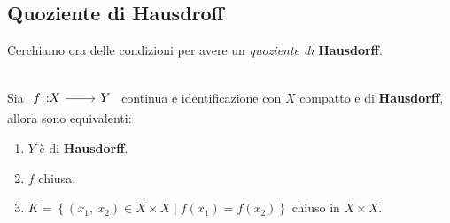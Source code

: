 \subsection{Quoziente di Hausdroff}
Cerchiamo ora delle condizioni per avere un \textit{quoziente di} \textbf{Hausdorff}.
\begin{theorema}~{}\\ \label{quozientehausdorff}
	Sia $\funz f X Y$ continua e identificazione con $X$ compatto e di \textbf{Hausdorff}, allora sono equivalenti:
		\begin{enumerate}
			\item $Y$ è di \textbf{Hausdorff}.
			\item $f$ chiusa.
			\item $K=\left\{ (x_1,\ x_2)\in X\times X \mid f(x_1)=f(x_2) \right\}$ chiuso in $X\times X$.
		\end{enumerate}
	\vspace{-3mm}
\end{theorema}
